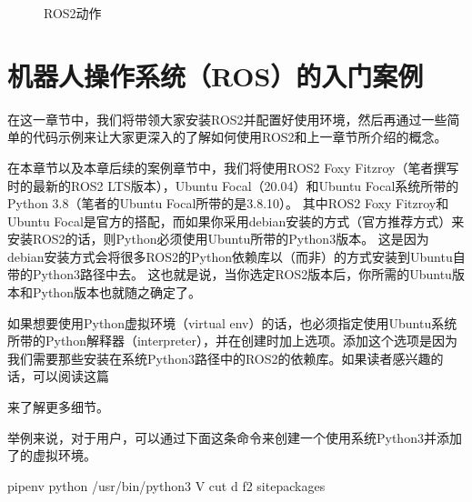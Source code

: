 \documentclass[letterpaper,10pt,english]{sphinxmanual}
\let\sphinxpxdimen\pdfpxdimen\else\newdimen\sphinxpxdimen
\begin{document}
\begin{figure}[H]
\centering
\capstart

\noindent\sphinxincludegraphics[width=800\sphinxpxdimen]{{ros2_actions}.png}
\caption{ROS2动作}\label{\detokenize{chapter_rl_sys/ros:id10}}\label{\detokenize{chapter_rl_sys/ros:ros2-actions}}\end{figure}


\section{机器人操作系统（ROS）的入门案例}
\label{\detokenize{chapter_rl_sys/ros_code_ex:ros}}\label{\detokenize{chapter_rl_sys/ros_code_ex::doc}}
\sphinxAtStartPar
在这一章节中，我们将带领大家安装ROS2并配置好使用环境，然后再通过一些简单的代码示例来让大家更深入的了解如何使用ROS2和上一章节所介绍的概念。

\sphinxAtStartPar
在本章节以及本章后续的案例章节中，我们将使用ROS2 Foxy
Fitzroy（笔者撰写时的最新的ROS2 LTS版本），Ubuntu Focal（20.04）和Ubuntu
Focal系统所带的Python 3.8（笔者的Ubuntu Focal所带的是3.8.10）。 其中ROS2
Foxy Fitzroy和Ubuntu
Focal是官方的搭配，而如果你采用debian安装的方式（官方推荐方式）来安装ROS2的话，则Python必须使用Ubuntu所带的Python3版本。
这是因为debian安装方式会将很多ROS2的Python依赖库以（而非）的方式安装到Ubuntu自带的Python3路径中去。
这也就是说，当你选定ROS2版本后，你所需的Ubuntu版本和Python版本也就随之确定了。

\sphinxAtStartPar
如果想要使用Python虚拟环境（virtual
env）的话，也必须指定使用Ubuntu系统所带的Python解释器（interpreter），并在创建时加上选项。添加这个选项是因为我们需要那些安装在系统Python3路径中的ROS2的依赖库。如果读者感兴趣的话，可以阅读这篇%
\begin{footnote}[89]\sphinxAtStartFootnote
{}
%
\end{footnote}来了解更多细节。

\sphinxAtStartPar
举例来说，对于用户，可以通过下面这条命令来创建一个使用系统Python3并添加了的虚拟环境。

\begin{sphinxVerbatim}[commandchars=\\\{\}]
pipenv \PYGZhy{}\PYGZhy{}python /usr/bin/python3 \PYGZhy{}V  cut \PYGZhy{}d \PYGZhy{}f2 \PYGZhy{}\PYGZhy{}site\PYGZhy{}packages
\end{sphinxVerbatim}
\end{document}
